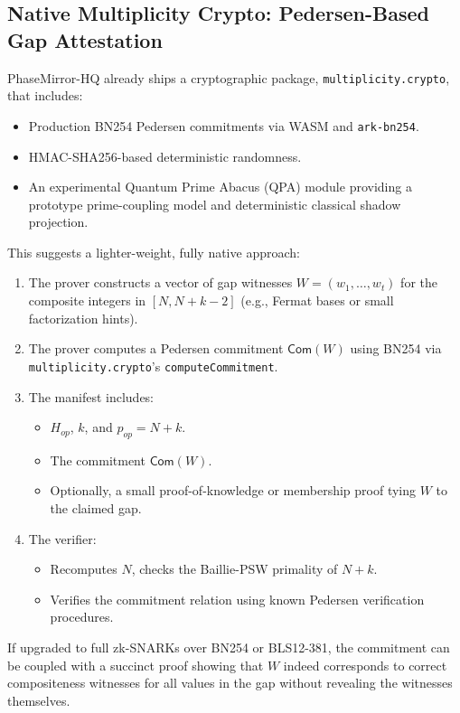 \documentclass[11pt]{article}
\begin{document}
\subsection{Native Multiplicity Crypto: Pedersen-Based Gap Attestation}

PhaseMirror-HQ already ships a cryptographic package, \texttt{multiplicity.crypto}, that includes:

\begin{itemize}[leftmargin=*]
  \item Production BN254 Pedersen commitments via WASM and \texttt{ark-bn254}.
  \item HMAC-SHA256-based deterministic randomness.
  \item An experimental Quantum Prime Abacus (QPA) module providing a prototype prime-coupling model and deterministic classical shadow projection.
\end{itemize}

This suggests a lighter-weight, fully native approach:

\begin{enumerate}[leftmargin=*]
  \item The prover constructs a vector of gap witnesses \( W = (w_1, \dots, w_t) \) for the composite integers in \( [N, N+k-2] \) (e.g., Fermat bases or small factorization hints).
  \item The prover computes a Pedersen commitment \(\mathsf{Com}(W)\) using BN254 via \texttt{multiplicity.crypto}'s \texttt{computeCommitment}.
  \item The manifest includes:
  \begin{itemize}
    \item \( H_{op} \), \( k \), and \( p_{op} = N+k \).
    \item The commitment \( \mathsf{Com}(W) \).
    \item Optionally, a small proof-of-knowledge or membership proof tying \( W \) to the claimed gap.
  \end{itemize}
  \item The verifier:
  \begin{itemize}
    \item Recomputes \( N \), checks the Baillie-PSW primality of \( N+k \).
    \item Verifies the commitment relation using known Pedersen verification procedures.
  \end{itemize}
\end{enumerate}

If upgraded to full zk-SNARKs over BN254 or BLS12-381, the commitment can be coupled with a succinct proof showing that \( W \) indeed corresponds to correct compositeness witnesses for all values in the gap without revealing the witnesses themselves.
\end{document}
